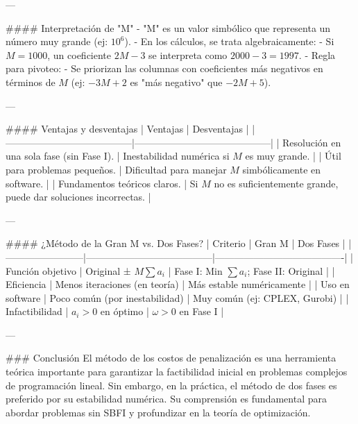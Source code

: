 ---

#### Interpretación de "M"
- "M" es un valor simbólico que representa un número muy grande (ej: \(10^6\)).  
- En los cálculos, se trata algebraicamente:  
  - Si \(M = 1000\), un coeficiente \(2M - 3\) se interpreta como \(2000 - 3 = 1997\).  
- Regla para pivoteo:  
  - Se priorizan las columnas con coeficientes más negativos en términos de \(M\) (ej: \(-3M + 2\) es "más negativo" que \(-2M + 5\)).

---

#### Ventajas y desventajas
| Ventajas                          | Desventajas                          |
|---------------------------------------|------------------------------------------|
| Resolución en una sola fase (sin Fase I). | Inestabilidad numérica si \(M\) es muy grande. |
| Útil para problemas pequeños.         | Dificultad para manejar \(M\) simbólicamente en software. |
| Fundamentos teóricos claros.          | Si \(M\) no es suficientemente grande, puede dar soluciones incorrectas. |

---

#### ¿Método de la Gran M vs. Dos Fases?
| Criterio           | Gran M                            | Dos Fases                          |
|------------------------|---------------------------------------|----------------------------------------|
| Función objetivo   | Original ± \(M \sum a_i\)             | Fase I: Min \(\sum a_i\); Fase II: Original |
| Eficiencia         | Menos iteraciones (en teoría)         | Más estable numéricamente              |
| Uso en software    | Poco común (por inestabilidad)       | Muy común (ej: CPLEX, Gurobi)         |
| Infactibilidad     | \(a_i > 0\) en óptimo                | \(\omega > 0\) en Fase I              |

---

### Conclusión
El método de los costos de penalización es una herramienta teórica importante para garantizar la factibilidad inicial en problemas complejos de programación lineal. Sin embargo, en la práctica, el método de dos fases es preferido por su estabilidad numérica. Su comprensión es fundamental para abordar problemas sin SBFI y profundizar en la teoría de optimización.